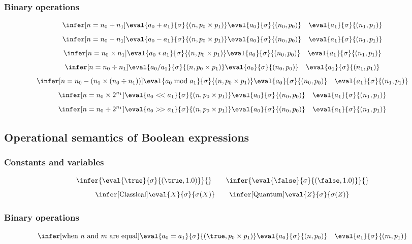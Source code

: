 \subsubsection{Binary operations}
\[
\infer[{n=n_0+n_1}]{\eval{a_0 + a_1}{\sigma}{(n,p_0 \times p_1)}}
    {\eval{a_0}{\sigma}{(n_0,p_0)}\quad\eval{a_1}{\sigma}{(n_1,p_1)} }
\]
\[
\infer[{n=n_0-n_1}]{\eval{a_0 - a_1}{\sigma}{(n,p_0 \times p_1)}}
    {\eval{a_0}{\sigma}{(n_0,p_0)}\quad\eval{a_1}{\sigma}{(n_1,p_1)} }
\]
\[
\infer[{n=n_0\times n_1}]{\eval{a_0 * a_1}{\sigma}{(n,p_0 \times p_1)}}
    {\eval{a_0}{\sigma}{(n_0,p_0)}\quad\eval{a_1}{\sigma}{(n_1,p_1)} }
\]
\[
\infer[{n=n_0 \div n_1}]{\eval{a_0 / a_1}{\sigma}{(n,p_0 \times p_1)}}
    {\eval{a_0}{\sigma}{(n_0,p_0)}\quad\eval{a_1}{\sigma}{(n_1,p_1)} }
\]
\[
\infer[{n=n_0 - (n_1 \times (n_0 \div n_1))}]{\eval{a_0 \bmod a_1}{\sigma}{(n,p_0 \times p_1)}}
    {\eval{a_0}{\sigma}{(n_0,p_0)}\quad\eval{a_1}{\sigma}{(n_1,p_1)} }
\]
\[
\infer[{n=n_0 \times 2^{n_1}}]{\eval{a_0 <\!< a_1}{\sigma}{(n,p_0 \times p_1)}}
    {\eval{a_0}{\sigma}{(n_0,p_0)}\quad\eval{a_1}{\sigma}{(n_1,p_1)} }
\]
\[
\infer[{n=n_0 \div 2^{n_1}}]{\eval{a_0 >\!> a_1}{\sigma}{(n,p_0 \times p_1)}}
    {\eval{a_0}{\sigma}{(n_0,p_0)}\quad\eval{a_1}{\sigma}{(n_1,p_1)} }
\]


\subsection{Operational semantics of Boolean expressions}\label{subsec:opboolean}

\subsubsection{Constants and variables}
\[\infer{\eval{\true}{\sigma}{(\true,1.0)}}{}
\qquad
\infer{\eval{\false}{\sigma}{(\false,1.0)}}{}
\]
\[
\infer[\mathrm{Classical}]{\eval{X}{\sigma}{\sigma(X)}}{}
\qquad
\infer[\mathrm{Quantum}]{\eval{Z}{\sigma}{\sigma(Z)}}{}
\]
\subsubsection{Binary operations}
\[
\infer[\mathrm{when\ }n\mathrm{\ and\ }m\mathrm{\ are\ equal}]
     {\eval{a_0 = a_1}{\sigma}{(\true,p_0 \times p_1)}}
    {\eval{a_0}{\sigma}{(n,p_0)}\quad\eval{a_1}{\sigma}{(m,p_1)} }
\]